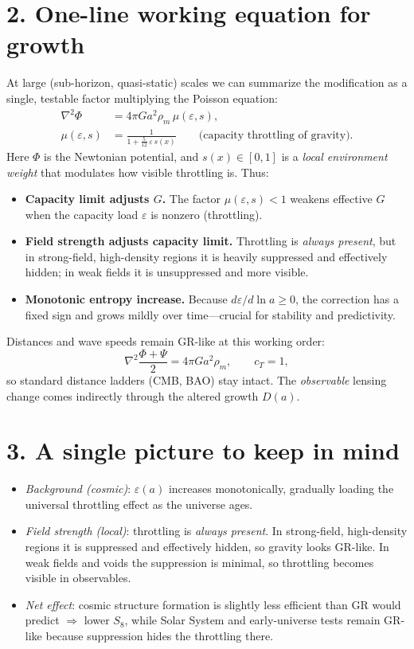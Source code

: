 \documentclass[aps,prd,onecolumn,superscriptaddress,nofootinbib]{revtex4-2}
\newcommand{\eps}{\varepsilon}
\begin{document}
\section*{2. One-line working equation for growth}
At large (sub-horizon, quasi-static) scales we can summarize the modification as a single, testable factor multiplying the Poisson equation:
\begin{align}
\nabla^2\Phi &= 4\pi G a^2 \rho_m \,\mu(\eps,s), \\
\mu(\eps,s) &= \frac{1}{1+\frac{5}{12}\,\eps\,s(x)} \qquad \text{(capacity throttling of gravity)}.
\end{align}
Here $\Phi$ is the Newtonian potential, and $s(x)\!\in[0,1]$ is a \emph{local environment weight} that modulates how visible throttling is. Thus:

\begin{itemize}
\item \textbf{Capacity limit adjusts $G$.} The factor $\mu(\eps,s)<1$ weakens effective $G$ when the capacity load $\eps$ is nonzero (throttling).
\item \textbf{Field strength adjusts capacity limit.} Throttling is \emph{always present}, but in strong-field, high-density regions it is heavily suppressed and effectively hidden; in weak fields it is unsuppressed and more visible.
\item \textbf{Monotonic entropy increase.} Because $d\eps/d\ln a\!\ge\!0$, the correction has a fixed sign and grows mildly over time---crucial for stability and predictivity.
\end{itemize}

Distances and wave speeds remain GR-like at this working order:
\[
\nabla^2\frac{\Phi+\Psi}{2}=4\pi G a^2\rho_m, \qquad c_T=1,
\]
so standard distance ladders (CMB, BAO) stay intact. The \emph{observable} lensing change comes indirectly through the altered growth $D(a)$.

\section*{3. A single picture to keep in mind}
\begin{itemize}
\item \emph{Background (cosmic)}: $\varepsilon(a)$ increases monotonically, gradually loading the universal throttling effect as the universe ages.
\item \emph{Field strength (local)}: throttling is \emph{always present}. In strong-field, high-density regions it is suppressed and effectively hidden, so gravity looks GR-like. In weak fields and voids the suppression is minimal, so throttling becomes visible in observables.
\item \emph{Net effect}: cosmic structure formation is slightly less efficient than GR would predict $\Rightarrow$ lower $S_8$, while Solar System and early-universe tests remain GR-like because suppression hides the throttling there.
\end{itemize}
\end{document}
